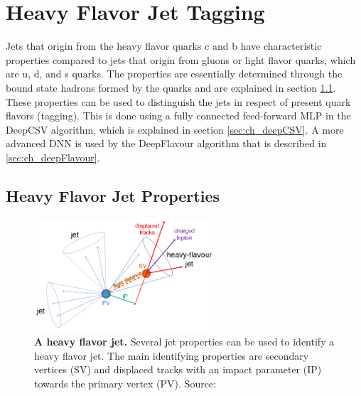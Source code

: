 \chapter{Heavy Flavor Jet Tagging}
Jets that origin from the heavy flavor quarks c and b have characteristic properties compared to jets that origin from gluons or light flavor quarks, which are u, d, and s quarks. The properties are essentially determined through the bound state hadrons formed by the quarks and are explained in section \ref{sec:ch_tag_properties}. These properties can be used to distinguish the jets in respect of present quark flavors (tagging). This is done using a fully connected feed-forward MLP in the DeepCSV algorithm, which is explained in section \ref{sec:ch_deepCSV}. A more advanced DNN is used by the DeepFlavour algorithm that is described in \ref{sec:ch_deepFlavour}.

\section{Heavy Flavor Jet Properties}\label{sec:ch_tag_properties}
\begin{figure}
\centering
\includegraphics[width=0.6\textwidth]{chapter_5_tagging/SV.png}
\caption[Heavy Flavor Jet]{\textbf{A heavy flavor jet.} Several jet properties can be used to identify a heavy flavor jet. The main identifying properties are secondary vertices (SV) and displaced tracks with an impact parameter (IP) towards the primary vertex (PV).  Source: \cite{HeavyFlavorIdentification}}
\label{fig:ch_5_SV}
\end{figure}

